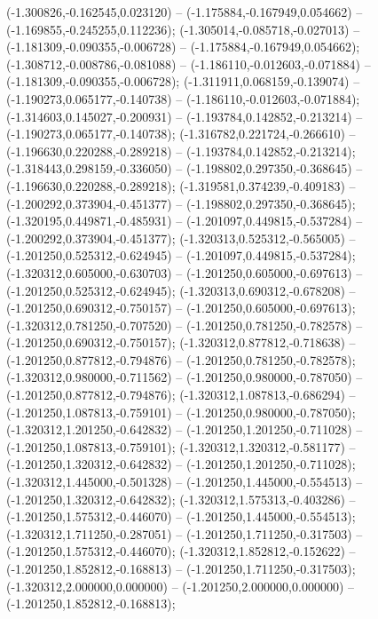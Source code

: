  (-1.300826,-0.162545,0.023120) -- (-1.175884,-0.167949,0.054662) -- (-1.169855,-0.245255,0.112236);
 (-1.305014,-0.085718,-0.027013) -- (-1.181309,-0.090355,-0.006728) -- (-1.175884,-0.167949,0.054662);
 (-1.308712,-0.008786,-0.081088) -- (-1.186110,-0.012603,-0.071884) -- (-1.181309,-0.090355,-0.006728);
 (-1.311911,0.068159,-0.139074) -- (-1.190273,0.065177,-0.140738) -- (-1.186110,-0.012603,-0.071884);
 (-1.314603,0.145027,-0.200931) -- (-1.193784,0.142852,-0.213214) -- (-1.190273,0.065177,-0.140738);
 (-1.316782,0.221724,-0.266610) -- (-1.196630,0.220288,-0.289218) -- (-1.193784,0.142852,-0.213214);
 (-1.318443,0.298159,-0.336050) -- (-1.198802,0.297350,-0.368645) -- (-1.196630,0.220288,-0.289218);
 (-1.319581,0.374239,-0.409183) -- (-1.200292,0.373904,-0.451377) -- (-1.198802,0.297350,-0.368645);
 (-1.320195,0.449871,-0.485931) -- (-1.201097,0.449815,-0.537284) -- (-1.200292,0.373904,-0.451377);
 (-1.320313,0.525312,-0.565005) -- (-1.201250,0.525312,-0.624945) -- (-1.201097,0.449815,-0.537284);
 (-1.320312,0.605000,-0.630703) -- (-1.201250,0.605000,-0.697613) -- (-1.201250,0.525312,-0.624945);
 (-1.320313,0.690312,-0.678208) -- (-1.201250,0.690312,-0.750157) -- (-1.201250,0.605000,-0.697613);
 (-1.320312,0.781250,-0.707520) -- (-1.201250,0.781250,-0.782578) -- (-1.201250,0.690312,-0.750157);
 (-1.320312,0.877812,-0.718638) -- (-1.201250,0.877812,-0.794876) -- (-1.201250,0.781250,-0.782578);
 (-1.320312,0.980000,-0.711562) -- (-1.201250,0.980000,-0.787050) -- (-1.201250,0.877812,-0.794876);
 (-1.320312,1.087813,-0.686294) -- (-1.201250,1.087813,-0.759101) -- (-1.201250,0.980000,-0.787050);
 (-1.320312,1.201250,-0.642832) -- (-1.201250,1.201250,-0.711028) -- (-1.201250,1.087813,-0.759101);
 (-1.320312,1.320312,-0.581177) -- (-1.201250,1.320312,-0.642832) -- (-1.201250,1.201250,-0.711028);
 (-1.320312,1.445000,-0.501328) -- (-1.201250,1.445000,-0.554513) -- (-1.201250,1.320312,-0.642832);
 (-1.320312,1.575313,-0.403286) -- (-1.201250,1.575312,-0.446070) -- (-1.201250,1.445000,-0.554513);
 (-1.320312,1.711250,-0.287051) -- (-1.201250,1.711250,-0.317503) -- (-1.201250,1.575312,-0.446070);
 (-1.320312,1.852812,-0.152622) -- (-1.201250,1.852812,-0.168813) -- (-1.201250,1.711250,-0.317503);
 (-1.320312,2.000000,0.000000) -- (-1.201250,2.000000,0.000000) -- (-1.201250,1.852812,-0.168813);

